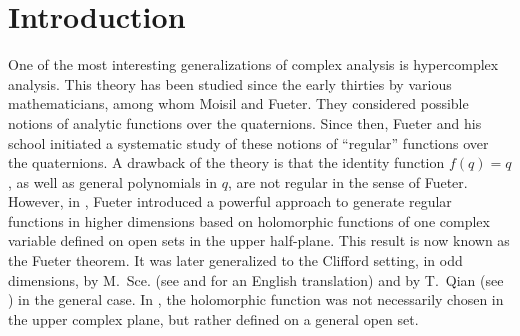 \documentclass[reqno,11pt]{amsart}
\numberwithin{equation}{section}
\theoremstyle{definition}
\begin{document}
\section{Introduction}


One of the most interesting generalizations of complex analysis is hypercomplex analysis. This theory has been studied since the early  thirties by various mathematicians, among whom Moisil and Fueter. They considered possible notions of analytic functions over the quaternions. Since then, Fueter and his school initiated a systematic study of these notions of “regular” functions over the quaternions.
A drawback of the theory is that the identity function $f(q)=q$, as well as general polynomials in $q$, are not regular in the sense of Fueter. However, in \cite{Fueter}, Fueter introduced a powerful approach to generate regular functions in higher dimensions based on holomorphic functions of one complex variable defined on open sets in the upper half-plane. This result is now known as the Fueter theorem. It was later generalized to the Clifford setting, in odd dimensions, by M.~Sce. (see \cite{SC} and \cite{ColSabStrupSce} for an English translation) and by T.~Qian (see \cite{Q}) in the general case. In \cite{Q, Q1, TAOBOOK}, the holomorphic function was not necessarily chosen in the upper complex plane, but rather defined on a general open set.
\end{document}
